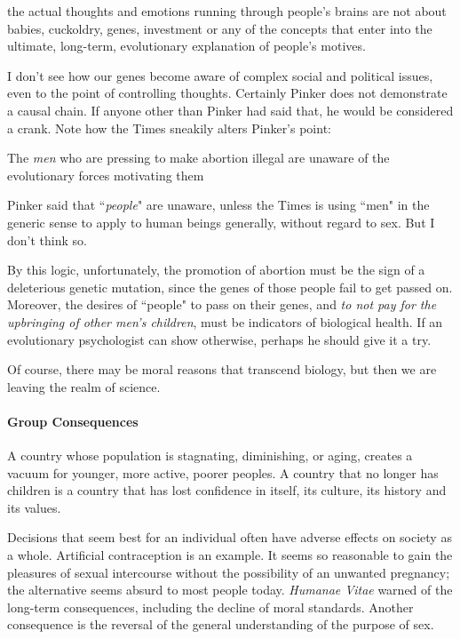 \begin{quotex}
the actual thoughts and emotions running through people's brains are not about babies, cuckoldry, genes, investment or any of the concepts that enter into the ultimate, long-term, evolutionary explanation of people's motives. 

\end{quotex}
I don't see how our genes become aware of complex social and political issues, even to the point of controlling thoughts. Certainly Pinker does not demonstrate a causal chain. If anyone other than Pinker had said that, he would be considered a crank. Note how the Times sneakily alters Pinker's point:

\begin{quotex}
The \emph{men} who are pressing to make abortion illegal are unaware of the evolutionary forces motivating them 

\end{quotex}
Pinker said that ``\emph{people}" are unaware, unless the Times is using ``men" in the generic sense to apply to human beings generally, without regard to sex. But I don't think so.

By this logic, unfortunately, the promotion of abortion must be the sign of a deleterious genetic mutation, since the genes of those people fail to get passed on. Moreover, the desires of ``people" to pass on their genes, and \emph{to not pay for the upbringing of other men's children}, must be indicators of biological health. If an evolutionary psychologist can show otherwise, perhaps he should give it a try.

Of course, there may be moral reasons that transcend biology, but then we are leaving the realm of science.

\paragraph{Group Consequences}
\begin{quotex}
A country whose population is stagnating, diminishing, or aging, creates a vacuum for younger, more active, poorer peoples. A country that no longer has children is a country that has lost confidence in itself, its culture, its history and its values. 

\end{quotex}
Decisions that seem best for an individual often have adverse effects on society as a whole. Artificial contraception is an example. It seems so reasonable to gain the pleasures of sexual intercourse without the possibility of an unwanted pregnancy; the alternative seems absurd to most people today. \emph{Humanae Vitae} warned of the long-term consequences, including the decline of moral standards. Another consequence is the reversal of the general understanding of the purpose of sex.

